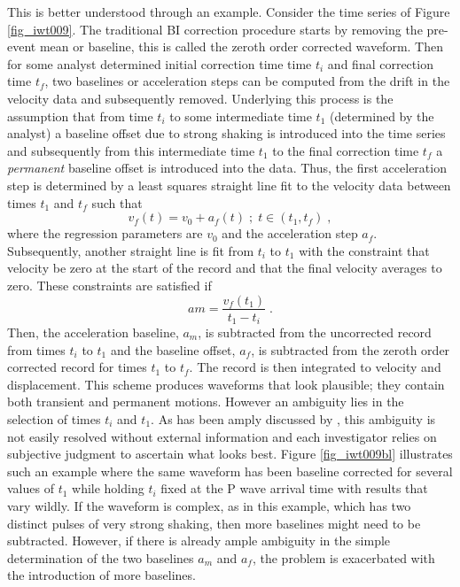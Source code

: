 This is better understood through an example. Consider the time series of Figure \ref{fig_iwt009}. The traditional BI correction procedure starts by removing the pre-event mean or baseline, this is called the zeroth order corrected waveform. Then for some analyst determined initial correction time time $t_i$ and final correction time $t_f$, two baselines or acceleration steps can be computed from the drift in the velocity data and subsequently removed. Underlying this process is the assumption that from time $t_i$ to some intermediate time $t_1$ (determined by the analyst) a baseline offset due to strong shaking is introduced into the time series and subsequently from this intermediate time $t_1$ to the final correction time $t_f$ a \textit{permanent} baseline offset is introduced into the data. Thus, the first acceleration step is determined by a least squares straight line fit to the velocity data between times $t_1$ and $t_f$ such that
\begin{equation}
v_f(t)=v_0+a_f(t)\;;\;t\in(t_1,t_f)\;,
\end{equation}
where the regression parameters are $v_0$ and the acceleration step $a_f$. Subsequently, another straight line is fit from $t_i$ to $t_1$ with the constraint that velocity be zero at the start of the record and that the final velocity averages to zero. These constraints are satisfied if \citep{Boore1999}
\begin{equation}
am=\frac{v_f(t_1)}{t_1-t_i}\;.
\end{equation}
Then, the acceleration baseline, $a_m$, is subtracted from the uncorrected record from times $t_i$ to $t_1$ and the baseline offset, $a_f$, is subtracted from the zeroth order corrected record for times $t_1$ to $t_f$. The record is then integrated to velocity and displacement. This scheme produces waveforms that look plausible; they contain both transient and permanent motions. However an ambiguity lies in the selection of times $t_i$ and $t_1$. As has been amply discussed by \citet{Boore1999,Boore2001}, this ambiguity is not easily resolved without external information and each investigator relies on subjective judgment to ascertain what looks best. Figure \ref{fig_iwt009bl} illustrates such an example where the same waveform has been baseline corrected for several values of $t_1$ while holding $t_i$ fixed at the P wave arrival time with results that vary wildly. If the waveform is complex, as in this example, which has two distinct pulses of very strong shaking, then more baselines might need to be subtracted. However, if there is already ample ambiguity in the simple determination of the two baselines $a_m$ and $a_f$, the problem is exacerbated with the introduction of more baselines. 

